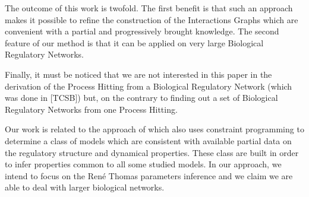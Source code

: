 The outcome of this work is twofold.
The first benefit is that such an approach makes it possible to refine the construction of the Interactions Graphs which are convenient with a partial and progressively brought knowledge.
The second feature of our method is that it can be applied on very large Biological Regulatory Networks.

Finally, it must be noticed that we are not interested in this paper in the derivation of the Process Hitting from a Biological Regulatory Network (which was done in [TCSB]) but, on the contrary to finding out a set of Biological Regulatory Networks from one Process Hitting.

Our work is related to the approach of \cite{20646302,DBLP:conf/ipcat/CorblinFTCT12} which also uses constraint programming to determine a class of models which are consistent with available partial data on the regulatory structure and dynamical properties.
These class are built in order to infer properties common to all some studied models.
In our approach, we intend to focus on the Ren\'e Thomas parameters inference and we claim we are able to deal with larger biological networks.
